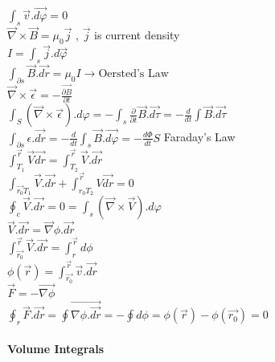 \documentclass[12]{article}
\begin{document}
$\int_{s}\vec{v}.\vec{d \varphi}=0$\\

$\vec{\nabla}\times\vec{B}=\mu_{0}\vec{j}$ \hspace{5mm}, $\vec{j}$ is current density\\

$I=\int_{s}\vec{j}.d\vec{\varphi}$\\

$\int_{\partial s}\vec{B}.\vec{dr}=\mu_{0}I \rightarrow \mbox{Oersted’s Law}$\\

$\vec{\nabla}\times \vec{\epsilon}=-\frac{\vec{\partial B}}{\partial t}$\\

$\int_{S}(\vec{\nabla}\times \vec{\epsilon}).d\varphi=-\int_{s}\frac{\partial}{\partial t}\vec{B}.\vec{d \tau}=-\frac{d}{dt}\int \vec{B}.\vec{d \tau}$\\

$\int_{\partial s}\epsilon . \vec{dr} = -\frac{d}{dt}\int_{s}\vec{B}.\vec{d \varphi}=-\frac{d \Phi}{dt}S$ Faraday’s Law\\

$\int_{T_{1}}^{\vec{r}}\vec{V}\vec{dr}=\int_{T_{2}}^{\vec{r}}\vec{V}.\vec{dr}$\\

$\int_{\vec{r_{0}}T_{1}}\vec{V}.\vec{dr}+\int_{r_{0}T_{2}}^{\vec{r}}V\vec{dr}=0$\\

$\oint_{c}\vec{V}.\vec{dr}=0=\int_{s}(\vec{\nabla}\times \vec{V}).d \varphi$\\

$\vec{V}.\vec{dr}=\vec{\nabla}\phi.\vec{dr}$\\

$\int_{\vec{r_{0}}}^{\vec{r}}\vec{V}.\vec{dr}=\int_{r}^{\vec{r}}d \phi$\\

$\phi(\vec{r})=\int_{\vec{r_{0}}}^{\vec{r}}\vec{v}.\vec{dr}$\\

$\vec{F}=-\vec{\nabla \phi}$\\

$\oint_{r}\vec{F}.\vec{dr}=\oint \vec{\nabla \phi.\vec{dr}}=-\oint d \phi =\phi(\vec{r})-\phi(\vec{r_{0}})=0$\\

\paragraph*{Volume Integrals}
\end{document}
